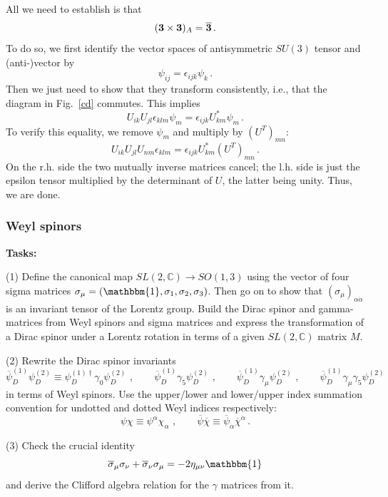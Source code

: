 \documentclass[12pt]{article}
\newcommand{\be}{\begin{equation}}
\newcommand{\ee}{\end{equation}}
\newcommand{\ol}{\overline}
\numberwithin{equation}{section}
\begin{document}
All we need to establish is that
\be
({\bf 3}\times {\bf 3})_A=\ol{\bf 3}\,.
\ee
To do so, we first identify the vector spaces of antisymmetric $SU(3)$ tensor and (anti-)vector by
\be
\psi_{ij}=\epsilon_{ijk}\psi_k\,.
\ee
Then we just need to show that they transform consistently, i.e., that the diagram in Fig.~\ref{cd} commutes. This implies
\be
U_{ik}U_{jl}\epsilon_{klm}\psi_m=\epsilon_{ijk}U^*_{km}\psi_m\,.
\ee
To verify this equality, we remove $\psi_m$ and multiply by $(U^T)_{mn}$:
\be
U_{ik}U_{jl}U_{nm}\epsilon_{klm}=\epsilon_{ijk}U^*_{km}(U^T)_{mn}\,.
\ee
On the r.h. side the two mutually inverse matrices cancel; the l.h. side is just the epsilon tensor multiplied by the determinant of $U$, the latter being unity. Thus, we are done.






\subsubsection{Weyl spinors}\label{wsp}

{\bf Tasks:} 

\noindent
(1) Define the canonical map $SL(2,\mathbb{C})\to SO(1,3)$ using the vector of four sigma matrices $\sigma_\mu=(\mathbbm{1},\sigma_1,\sigma_2, \sigma_3)$. Then go on to show that $(\sigma_\mu)_{\alpha\dot{\alpha}}$ is an invariant tensor of the Lorentz group. Build the Dirac spinor and gamma-matrices from Weyl spinors and sigma matrices and express the transformation of a Dirac spinor under a Lorentz rotation in terms of a given $SL(2,\mathbb{C})$ matrix $M$. 

\noindent
(2) Rewrite the Dirac spinor invariants 
\be
\ol{\psi}^{(1)}_D\psi^{(2)}_D\equiv \psi^{(1)\dagger}_D\gamma_0\psi^{(2)}_D\,\,, 
\qquad
\ol{\psi}^{(1)}_D\gamma_5\psi^{(2)}_D\,\,, 
\qquad
\ol{\psi}^{(1)}_D\gamma_\mu\psi^{(2)}_D\,\,, 
\qquad
\ol{\psi}^{(1)}_D\gamma_\mu\gamma_5\psi^{(2)}_D
\ee 
in terms of Weyl spinors. Use the upper/lower and lower/upper index summation convention for undotted and dotted Weyl indices respectively:
\be
\psi\chi\equiv \psi^\alpha\chi_\alpha\,\,,\qquad \ol{\psi}\ol{\chi}\equiv \ol{\psi}_{\dot{\alpha}}\ol{\chi}^{\dot{\alpha}}\,.
\ee

\noindent
(3) Check the crucial identity 
\be
\ol{\sigma}_\mu\sigma_\nu+\ol{\sigma}_\nu\sigma_\mu=-2\eta_{\mu\nu}\mathbbm{1} \label{smao}
\ee
and derive the Clifford algebra relation for the $\gamma$ matrices from it.
\noindent
\end{document}
